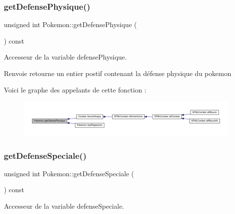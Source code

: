 \subsubsection{\texorpdfstring{get\+Defense\+Physique()}{getDefensePhysique()}}
{\footnotesize\ttfamily unsigned int Pokemon\+::get\+Defense\+Physique (\begin{DoxyParamCaption}{ }\end{DoxyParamCaption}) const}



Accesseur de la variable defense\+Physique. 

\begin{DoxyReturn}{Renvoie}
retourne un entier postif contenant la défense physique du pokemon 
\end{DoxyReturn}
Voici le graphe des appelants de cette fonction \+:\nopagebreak
\begin{figure}[H]
\begin{center}
\leavevmode
\includegraphics[width=350pt]{class_pokemon_a90e8c3b16d39995fcbcfd01834f57be7_icgraph}
\end{center}
\end{figure}
\mbox{\label{class_pokemon_a5f932295f014353aeead20e0225b6eee}} 
\subsubsection{\texorpdfstring{get\+Defense\+Speciale()}{getDefenseSpeciale()}}
{\footnotesize\ttfamily unsigned int Pokemon\+::get\+Defense\+Speciale (\begin{DoxyParamCaption}{ }\end{DoxyParamCaption}) const}



Accesseur de la variable defense\+Speciale. 

